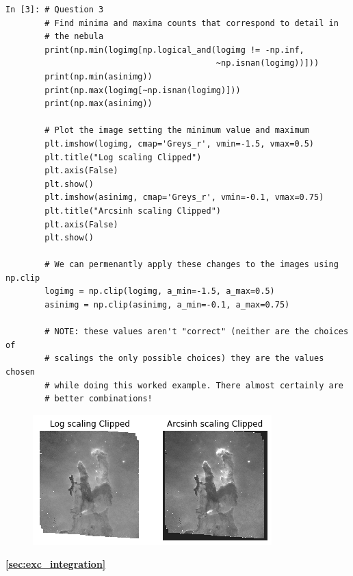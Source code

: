 \begin{lstlisting}[style=PY]
In [3]: # Question 3
        # Find minima and maxima counts that correspond to detail in 
        # the nebula
        print(np.min(logimg[np.logical_and(logimg != -np.inf, 
                                           ~np.isnan(logimg))]))
        print(np.min(asinimg))
        print(np.max(logimg[~np.isnan(logimg)]))
        print(np.max(asinimg))
        
        # Plot the image setting the minimum value and maximum
        plt.imshow(logimg, cmap='Greys_r', vmin=-1.5, vmax=0.5) 
        plt.title("Log scaling Clipped")
        plt.axis(False)
        plt.show()
        plt.imshow(asinimg, cmap='Greys_r', vmin=-0.1, vmax=0.75)
        plt.title("Arcsinh scaling Clipped")
        plt.axis(False)
        plt.show()
        
        # We can permenantly apply these changes to the images using np.clip
        logimg = np.clip(logimg, a_min=-1.5, a_max=0.5) 
        asinimg = np.clip(asinimg, a_min=-0.1, a_max=0.75)
        
        # NOTE: these values aren't "correct" (neither are the choices of 
        # scalings the only possible choices) they are the values chosen 
        # while doing this worked example. There almost certainly are 
        # better combinations!
\end{lstlisting}

\begin{figure}[H]
	\centering
	\includegraphics[width=\linewidth]{Pictures/logasinimgnormed.png}
\end{figure}

\newpage

\textbf{\ref{sec:exc_integration}}

